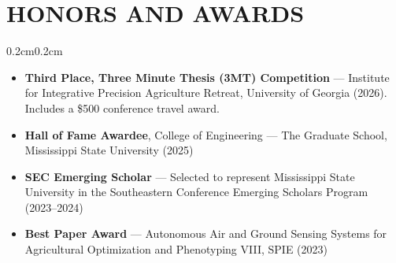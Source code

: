 \documentclass[10pt, letterpaper]{article}
\newenvironment{highlights}{%
    \begin{itemize}[topsep=0.08cm, parsep=0.08cm, partopsep=0pt,
                    itemsep=0pt, leftmargin=0.4cm + 10pt]
}{\end{itemize}}
\newenvironment{onecolentry}{%
    \begin{adjustwidth}{0.2cm}{0.2cm}
}{\end{adjustwidth}}
\begin{document}
\section{HONORS AND AWARDS}
\vspace{0.08cm}
\begin{onecolentry}
    \begin{highlights}
        \item \textbf{Third Place, Three Minute Thesis (3MT) Competition} ---
              Institute for Integrative Precision Agriculture Retreat, University of
              Georgia (2026). Includes a \$500 conference travel award.
        \item \textbf{Hall of Fame Awardee}, College of Engineering ---
              The Graduate School, Mississippi State University (2025)
        \item \textbf{SEC Emerging Scholar} --- Selected to represent Mississippi
              State University in the Southeastern Conference Emerging Scholars
              Program (2023--2024)
        \item \textbf{Best Paper Award} --- Autonomous Air and Ground Sensing Systems
              for Agricultural Optimization and Phenotyping VIII, SPIE (2023)
    \end{highlights}
\end{onecolentry}
\vspace{0.10cm}

\end{document}
